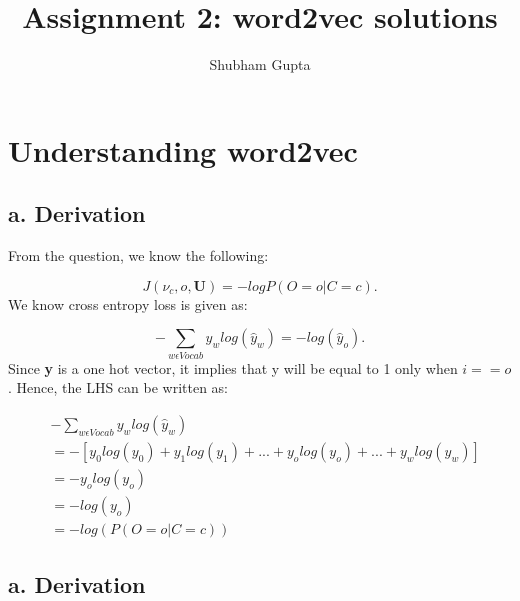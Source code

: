 \documentclass[a4paper]{article}
\title{Assignment 2: word2vec solutions}
\author{Shubham Gupta}
\begin{document}
\maketitle
\section{Understanding word2vec}
\subsection{a. Derivation}
From the question, we know the following:

\[
    J(\nu_c, o, \textbf{U}) = -logP(O=o | C=c) 
.\] 
We know cross entropy loss is given as:

\[
    -\sum_{w \epsilon Vocab} y_wlog(\hat{y}_w) = -log(\hat{y}_o)
.\] 
Since \textbf{y} is a one hot vector, it implies that y will be equal to 1 only when $i == o$. Hence, the LHS can be written as:

\begin{equation}
\begin{split}
& - \sum_{w \epsilon Vocab} y_wlog(\hat{y}_w) \\
& = -[y_0log(y_0) + y_1log(y_1)+...+y_olog(y_o)+...+y_wlog(y_w)] \\
& = -y_olog(y_o) \\
& = -log(y_o) \\
& = -log(P(O=o|C=c))
\end{split}
\end{equation}

\subsection{a. Derivation}
\end{document}
